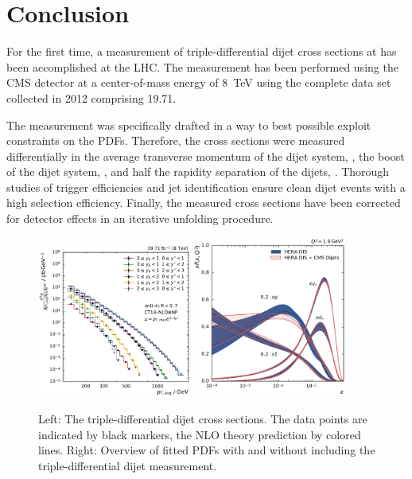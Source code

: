 
\chapter{Conclusion}

For the first time, a measurement of triple-differential dijet cross sections at
has been accomplished at the LHC. The measurement has been performed using the
CMS detector at a center-of-mass energy of \SI{8}{\TeV} using the complete data
set collected in 2012 comprising \SI{19.71}{\fbinv}. 

The measurement was specifically drafted in a way to best possible exploit
constraints on the PDFs. Therefore, the cross sections were measured
differentially in the average transverse momentum of the dijet system, \ptavg,
the boost of the dijet system, \yboost, and half the rapidity separation of the
dijets, \ystar. Thorough studies of trigger efficiencies and jet identification
ensure clean dijet events with a high selection efficiency. Finally, the
measured cross sections have been corrected for detector effects in an iterative
unfolding procedure.



\begin{figure}[h!tbp]
    \centering
    \includegraphics[width=0.45\textwidth]{figures/measurement/ptavg_spectrum.pdf}\hfill
    \includegraphics[width=0.45\textwidth]{figures/pdf_constraints/pdfcomp_direct_overview_1.9.pdf}
    \caption[Triple-differential dijet cross sections and PDF
    overview]{Left:
    The triple-differential dijet cross sections. The data points are indicated by black
    markers, the NLO theory prediction by colored lines. Right: Overview of
    fitted PDFs with and without including the triple-differential dijet
    measurement.}
    \label{fig:conclusion}
\end{figure}

